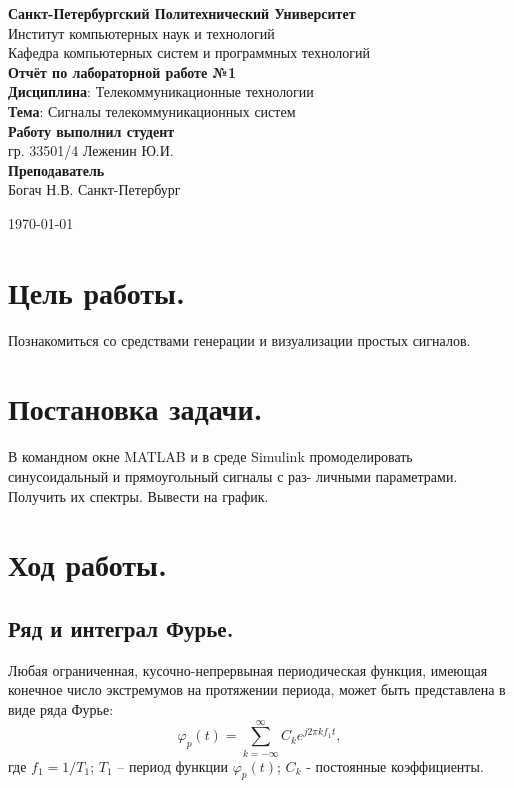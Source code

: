 \documentclass[a4paper,14pt]{extarticle}
\begin{document}
\begin{titlepage}
\centering 
{\bfseries Санкт-Петербургский Политехнический Университет} \\
Институт компьютерных наук и технологий \\
Кафедра компьютерных систем и программных технологий \\
\vspace{5cm}
{\centering \textbf{Отчёт по лабораторной работе №1} \\ 
\vspace{0.15cm}
\textbf{Дисциплина}: Телекоммуникационные технологии \\
\vspace{0.15cm}
\textbf{Тема}: Сигналы телекоммуникационных систем} \\
\vspace{4cm}
\hfill {\bfseries Работу выполнил студент}  \\
\hfill гр. 33501/4 Леженин Ю.И. \\
\hfill {\bfseries Преподаватель}  \\
\hfill Богач Н.В.
\vfill
Санкт-Петербург \\
{\large \today\par}
\end{titlepage}

\section{Цель работы.}

Познакомиться со средствами генерации и визуализации простых сигналов.

\section{Постановка задачи.} 

В командном окне MATLAB и в среде Simulink
промоделировать синусоидальный и прямоугольный сигналы с раз-
личными параметрами. Получить их спектры. Вывести на график.

\section{Ход работы.}

\subsection{Ряд и интеграл Фурье.}

Любая ограниченная, кусочно-непрервыная периодическая функция, имеющая конечное число экстремумов на протяжении периода, может быть представлена в виде ряда Фурье: 
\begin{equation*}
\varphi_p (t) = \sum_{k = -\infty}^{\infty} C_k e^{j 2 \pi k f_1 t} ,
\label{f1}
\end{equation*}
где $f_1 = 1 / T_1$; $T_1$ -- период функции $\varphi_p (t)$; $C_k$ - постоянные коэффициенты.
\end{document}
